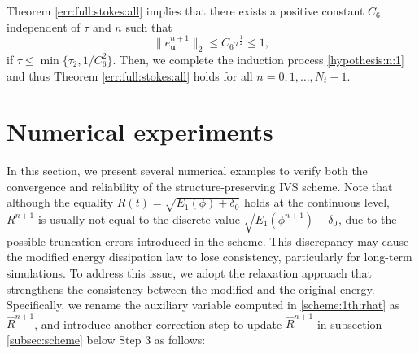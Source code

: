 \begin{remark} \label{remk:full_rate:1}
	Theorem \ref{err:full:stokes:all} implies that there exists a positive constant $C_{6}$ independent of $\tau$ and $n$ such that  
	\begin{equation*}
		\|e_{\bm u}^{n+1} \|_{2} \le C_{6} \tau^{\frac{1}{2}} \le 1,
	\end{equation*}
	if $\tau \leq \min\{\tau_2, 1/C_{6}^2\}$.
	Then, we complete the induction process \eqref{hypothesis:n:1} and thus Theorem \ref{err:full:stokes:all} holds for all $n=0,1,\ldots, N_t-1$.
\end{remark}


\section{Numerical experiments}\label{sec:test}
In this section, we present several numerical examples to verify both the convergence and reliability of the structure-preserving IVS scheme. 
Note that although the equality $R(t)=\sqrt{E_1(\phi)+\delta_0}$ holds at the continuous level,  $R^{n+1}$ is usually not equal to the discrete value $\sqrt{E_1(\phi^{n+1})+\delta_0}$, due to the possible truncation errors introduced in the scheme. This discrepancy may cause the modified energy dissipation law to lose consistency, particularly for long-term simulations.
To address this issue, we adopt the relaxation approach \cite{jiang2022improving} that strengthens the consistency between the modified and the original energy. Specifically, we rename the auxiliary variable computed in \eqref{scheme:1th:rhat} as $\widehat{R}^{n+1}$, and introduce another correction step to update $\widehat{R}^{n+1}$ in subsection \ref{subsec:scheme} below Step 3 as follows:
